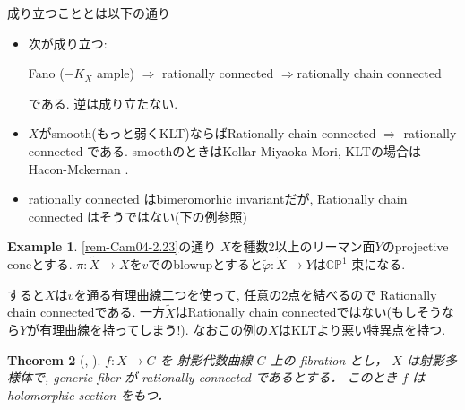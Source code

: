 \documentclass[dvipdfmx,a4paper,11pt]{article} %
\newtheorem{thm}{Theorem}[section]
\theoremstyle{definition}
\newtheorem{ex}[thm]{Example}
\theoremstyle{remark}
\numberwithin{equation}{section}
\newcommand{\C}{\mathbb{C}}
\begin{document}
成り立つこととは以下の通り
\begin{itemize}
\item 次が成り立つ:
\begin{center}
Fano ($-K_X$ ample) $\Rightarrow$ rationally connected $\Rightarrow $rationally chain connected
\end{center}
である. 逆は成り立たない. 
\item $X$がsmooth(もっと弱くKLT)ならばRationally chain connected $\Rightarrow$ rationally connected である. smoothのときはKollar-Miyaoka-Mori, KLTの場合はHacon-Mckernan \cite{HM07}.
\item rationally connected はbimeromorhic invariantだが, Rationally chain connected はそうではない(下の例参照)
\end{itemize}
\begin{ex}
\ref{rem-Cam04-2.23}の通り
$X$を種数2以上のリーマン面$Y$のprojective coneとする. 
$\pi : \widetilde{X} \to X$を$v$でのblowupとすると$\widetilde{\varphi} : \widetilde{X} \to Y$は$\C\mathbb{P}^1$-束になる.

すると$X$は$v$を通る有理曲線二つを使って, 任意の2点を結べるので Rationally chain connectedである. 
一方$ \widetilde{X}$はRationally chain connectedではない(もしそうなら$Y$が有理曲線を持ってしまう!).
なおこの例の$X$はKLTより悪い特異点を持つ. 
\end{ex}


\begin{thm}[{\cite[Theorem 3.19]{Cam04}, \cite{GHS03}}]
\label{thm-Cam04-3.19}
$f : X \to C$ を 射影代数曲線 $C$ 上の fibration とし， $X$ は射影多様体で, generic fiber が rationally connected であるとする．
このとき $f$ は holomorphic section をもつ．
\end{thm}
\end{document}
